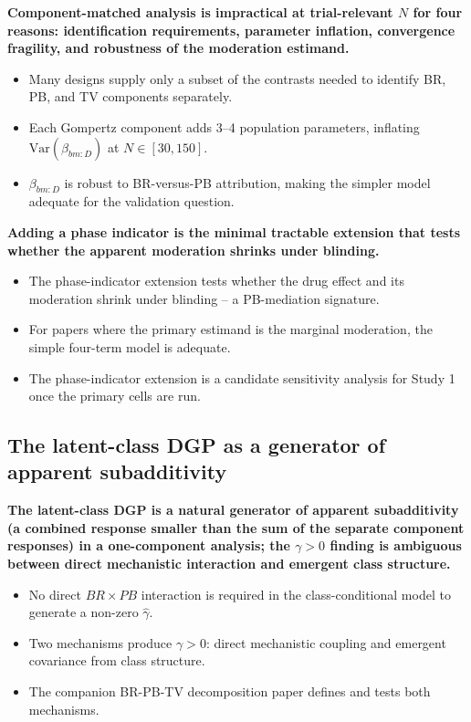 \documentclass[
  11pt,
]{article}
\begin{document}
\textbf{Component-matched analysis is impractical at trial-relevant
$N$ for four reasons: identification requirements, parameter inflation,
convergence fragility, and robustness of the moderation estimand.}

\begin{itemize}\setlength{\itemsep}{2pt}\setlength{\parskip}{0pt}
\item Many designs supply only a subset of the contrasts needed to
  identify BR, PB, and TV components separately.
\item Each Gompertz component adds 3--4 population parameters,
  inflating $\mathrm{Var}(\hat{\beta}_{bm:D})$ at $N \in [30,150]$.
\item $\beta_{bm:D}$ is robust to BR-versus-PB attribution, making
  the simpler model adequate for the validation question.
\end{itemize}

\textbf{Adding a phase indicator is the minimal tractable extension
that tests whether the apparent moderation shrinks under blinding.}

\begin{itemize}\setlength{\itemsep}{2pt}\setlength{\parskip}{0pt}
\item The phase-indicator extension tests whether the drug effect and
  its moderation shrink under blinding -- a PB-mediation signature.
\item For papers where the primary estimand is the marginal
  moderation, the simple four-term model is adequate.
\item The phase-indicator extension is a candidate sensitivity
  analysis for Study 1 once the primary cells are run.
\end{itemize}

\subsection{The latent-class DGP as a generator of apparent subadditivity}\label{the-latent-class-dgp-as-a-generator-of-apparent-subadditivity}

\textbf{The latent-class DGP is a natural generator of apparent
subadditivity (a combined response smaller than the sum of the
separate component responses) in a one-component analysis; the
$\gamma > 0$ finding is ambiguous between direct mechanistic
interaction and emergent class structure.}

\begin{itemize}\setlength{\itemsep}{2pt}\setlength{\parskip}{0pt}
\item No direct $BR \times PB$ interaction is required in the
  class-conditional model to generate a non-zero $\hat{\gamma}$.
\item Two mechanisms produce $\gamma > 0$: direct mechanistic coupling
  and emergent covariance from class structure.
\item The companion BR-PB-TV decomposition paper defines and tests
  both mechanisms.
\end{itemize}
\end{document}
